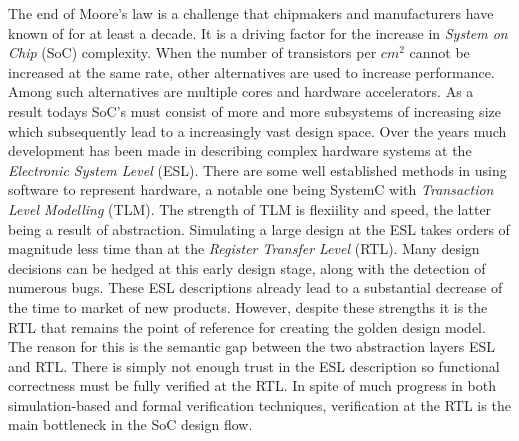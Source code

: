 The end of Moore's law is a challenge that chipmakers and manufacturers have known of for at least a decade. It is a driving factor for the increase in \textit{System on Chip} (SoC) complexity. When the number of transistors per $cm^2$ cannot be increased at the same rate, other alternatives are used to increase performance. Among such alternatives are multiple cores and hardware accelerators. As a result todays SoC's must consist of more and more subsystems of increasing size which subsequently lead to a increasingly vast design space. Over the years much development has been made in describing complex hardware systems at the \textit{Electronic System Level} (ESL). There are some well established methods in using software to represent hardware, a notable one being SystemC with \textit{Transaction Level Modelling} (TLM). The strength of TLM is flexiility and speed, the latter being a result of abstraction. Simulating a large design at the ESL takes orders of magnitude less time than at the \textit{Register Transfer Level} (RTL). Many design decisions can be hedged at this early design stage, along with the detection of numerous bugs. These ESL descriptions already lead to a substantial decrease of the time to market of new products. However, despite these strengths it is the RTL that remains the point of reference for creating the golden design model. The reason for this is the semantic gap between the two abstraction layers ESL and RTL. There is simply not enough trust in the ESL description so functional correctness must be fully verified at the RTL. In spite of much progress in both simulation-based and formal verification techniques, verification at the RTL is the main bottleneck in the SoC design flow. \\
\newline
